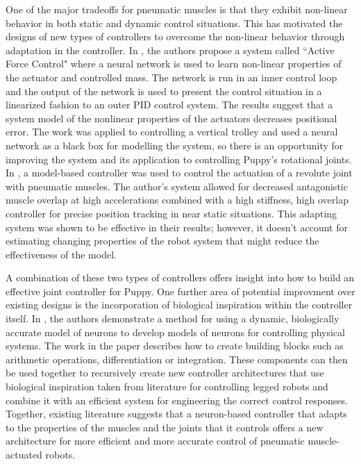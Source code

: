 \documentclass[letterpaper, 10 pt, conference]{IEEEconf} %
\begin{document}
One of the major tradeoffs for pneumatic muscles is that they exhibit 
non-linear behavior in both static and dynamic control situations.
\cite{HuntPMuscles, DynamicPMuscles} This has 
motivated the designs of new types of controllers to overcome the non-linear
behavior through adaptation in the controller. In \cite{Jahanabadi2009}, the
authors propose a system called ``Active Force Control" where a neural network
is used to learn non-linear properties of the actuator and controlled mass.
The network is run in an inner control loop and the output of the network is
used to present the control situation in a linearized fashion to an outer PID
control system. The results suggest that a system model of the nonlinear 
properties of the actuators decreases positional error. The work was
applied to controlling a vertical trolley and used a neural network as a black
box for modelling the system, so there is an opportunity for improving the 
system and its application to controlling Puppy's rotational joints. 
In \cite{Wang2013}, a model-based controller was used to control the actuation
of a revolute joint with pneumatic muscles. The author's system allowed for
decreased antagonistic muscle overlap at high accelerations combined with a 
high stiffness, high overlap controller for precise position tracking in near
static situations. This adapting system was shown to be effective in their
results; however, it doesn't account for estimating changing properties of the
robot system that might reduce the effectiveness of the model.

A combination of these two types of controllers offers insight into how to build
an effective joint controller for Puppy. One further area of potential 
improvment over existing designs is the incorporation of biological inspiration
within the controller itself. In \cite{NickFunctionalSubnetwork}, the authors
demonstrate a method for using a dynamic, biologically accurate model of neurons
to develop models of neurons for controlling physical systems. The work in the 
paper describes how to create building blocks such as arithmetic operations,
differentiation or integration. These components can then be used together to 
recursively create new controller architectures that use biological inspiration
taken from literature for controlling legged robots and combine it with an
efficient system for engineering the correct control responses. Together,
existing literature suggests that a neuron-based controller that adapts to the
properties of the muscles and the joints that it controls offers a new
architecture for more efficient and more accurate control of pneumatic muscle-
actuated robots.
\end{document}
